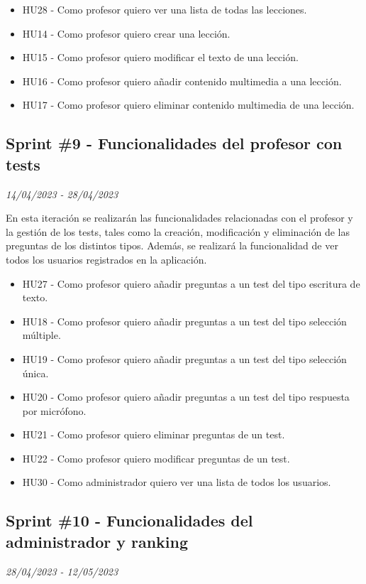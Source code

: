 \begin{itemize}
    \item HU28 - Como profesor quiero ver una lista de todas las lecciones.
    \item HU14 - Como profesor quiero crear una lección.
    \item HU15 - Como profesor quiero modificar el texto de una lección.
    \item HU16 - Como profesor quiero añadir contenido multimedia a una lección.
    \item HU17 - Como profesor quiero eliminar contenido multimedia de una lección.
\end{itemize}

\subsection{Sprint \#9 - Funcionalidades del profesor con tests}
\textit{14/04/2023   -   28/04/2023}

En esta iteración se realizarán las funcionalidades relacionadas con el profesor y la gestión de los tests, tales como la creación, modificación y eliminación de las preguntas
de los distintos tipos. Además, se realizará la funcionalidad de ver todos los usuarios registrados en la aplicación.


\begin{itemize}
    \item HU27 - Como profesor quiero añadir preguntas a un test del tipo escritura de texto.
    \item HU18 - Como profesor quiero añadir preguntas a un test del tipo selección múltiple.
    \item HU19 - Como profesor quiero añadir preguntas a un test del tipo selección única.
    \item HU20 - Como profesor quiero añadir preguntas a un test del tipo respuesta por micrófono.
    \item HU21 - Como profesor quiero eliminar preguntas de un test.
    \item HU22 - Como profesor quiero modificar preguntas de un test.
    \item HU30 - Como administrador quiero ver una lista de todos los usuarios.
\end{itemize}


\subsection{Sprint \#10 - Funcionalidades del administrador y ranking}
\textit{28/04/2023   -   12/05/2023}

